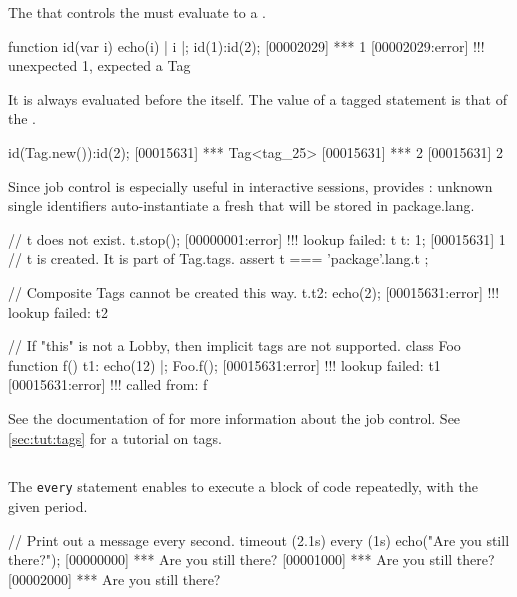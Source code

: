 The  that controls the  must evaluate to a
.

\begin{urbiscript}
function id(var i) { echo(i) | i }|;
id(1):id(2);
[00002029] *** 1
[00002029:error] !!! unexpected 1, expected a Tag
\end{urbiscript}

It is always evaluated before the  itself.  The value of a
tagged statement is that of the .
\begin{urbiscript}
id(Tag.new()):id(2);
[00015631] *** Tag<tag_25>
[00015631] *** 2
[00015631] 2
\end{urbiscript}

Since job control is especially useful in interactive sessions, \us provides
: unknown single identifiers auto-instantiate a fresh
 that will be stored in package.lang.

\begin{urbiscript}
// t does not exist.
t.stop();
[00000001:error] !!! lookup failed: t
t: 1;
[00015631] 1
// t is created.  It is part of Tag.tags.
assert
{
  t === 'package'.lang.t
};

// Composite Tags cannot be created this way.
t.t2: echo(2);
[00015631:error] !!! lookup failed: t2

// If "this" is not a Lobby, then implicit tags are not supported.
class Foo { function f() { t1: echo(12) } }|;
Foo.f();
[00015631:error] !!! lookup failed: t1
[00015631:error] !!!    called from: f
\end{urbiscript}


See the documentation of  for more information about the job
control.  See \autoref{sec:tut:tags} for a tutorial on tags.

\subsection{}
\label{sec:lang:every}
The \lstinline{every} statement enables to execute a block of code
repeatedly, with the given period.

\begin{urbiscript}
// Print out a message every second.
timeout (2.1s)
  every (1s)
    echo("Are you still there?");
[00000000] *** Are you still there?
[00001000] *** Are you still there?
[00002000] *** Are you still there?
\end{urbiscript}


